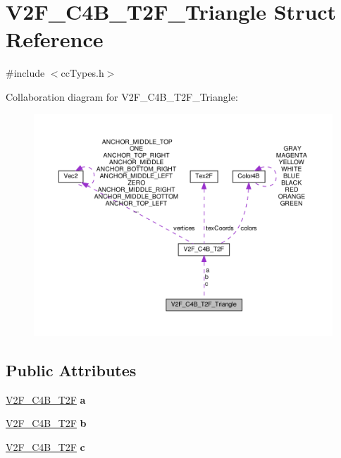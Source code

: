 \hypertarget{structV2F__C4B__T2F__Triangle}{}\section{V2\+F\+\_\+\+C4\+B\+\_\+\+T2\+F\+\_\+\+Triangle Struct Reference}
\label{structV2F__C4B__T2F__Triangle}


{\ttfamily \#include $<$cc\+Types.\+h$>$}



Collaboration diagram for V2\+F\+\_\+\+C4\+B\+\_\+\+T2\+F\+\_\+\+Triangle\+:
\nopagebreak
\begin{figure}[H]
\begin{center}
\leavevmode
\includegraphics[width=350pt]{structV2F__C4B__T2F__Triangle__coll__graph}
\end{center}
\end{figure}
\subsection*{Public Attributes}
\begin{DoxyCompactItemize}
\item 
\mbox{\label{structV2F__C4B__T2F__Triangle_a5239c2e2f44eb4f5ca43763a3e230464}} 
\hyperlink{structV2F__C4B__T2F}{V2\+F\+\_\+\+C4\+B\+\_\+\+T2F} {\bfseries a}
\item 
\mbox{\label{structV2F__C4B__T2F__Triangle_a4025bda10a3add1ffcdeeb9dbbf83d59}} 
\hyperlink{structV2F__C4B__T2F}{V2\+F\+\_\+\+C4\+B\+\_\+\+T2F} {\bfseries b}
\item 
\mbox{\label{structV2F__C4B__T2F__Triangle_a5253b89b043d9a14207702e831de0fe6}} 
\hyperlink{structV2F__C4B__T2F}{V2\+F\+\_\+\+C4\+B\+\_\+\+T2F} {\bfseries c}
\end{DoxyCompactItemize}


